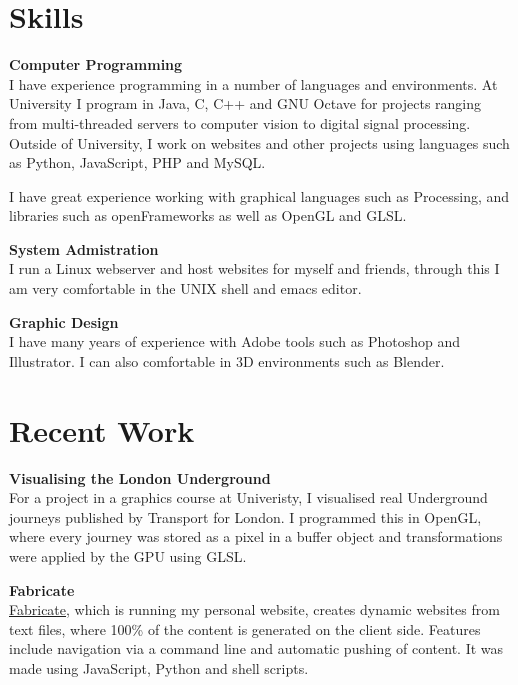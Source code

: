 \documentclass[margin,line,a4paper]{resume}
\begin{document}
\begin{resume}
\section{\mysidestyle Skills}

\textbf{Computer Programming} \vspace{1mm} \\
I have experience programming in a number of languages and environments. At University I program in Java, C, C++ and GNU Octave for projects ranging from multi-threaded servers to computer vision to digital signal processing. Outside of University, I work on websites and other projects using languages such as Python, JavaScript, PHP and MySQL.

I have great experience working with graphical languages such as Processing, and libraries such as openFrameworks as well as OpenGL and GLSL.

\textbf{System Admistration} \vspace{1mm} \\
I run a Linux webserver and host websites for myself and friends, through this I am very comfortable in the UNIX shell and emacs editor.

\textbf{Graphic Design} \vspace{1mm} \\
I have many years of experience with Adobe tools such as Photoshop and Illustrator. I can also comfortable in 3D environments such as Blender.

\section{\mysidestyle Recent Work}

\textbf{Visualising the London Underground} \vspace{1mm} \\
For a project in a graphics course at Univeristy, I visualised real Underground journeys published by Transport for London. I programmed this in OpenGL, where every journey was stored as a pixel in a buffer object and transformations were applied by the GPU using GLSL.

\textbf{Fabricate} \vspace{1mm} \\
\href{https://github.com/whg/fabricate}{Fabricate}, which is running my personal website, creates dynamic websites from text files, where 100\% of the content is generated on the client side. Features include navigation via a command line and automatic pushing of content. It was made using JavaScript, Python and shell scripts.


\end{resume}
\end{document}
